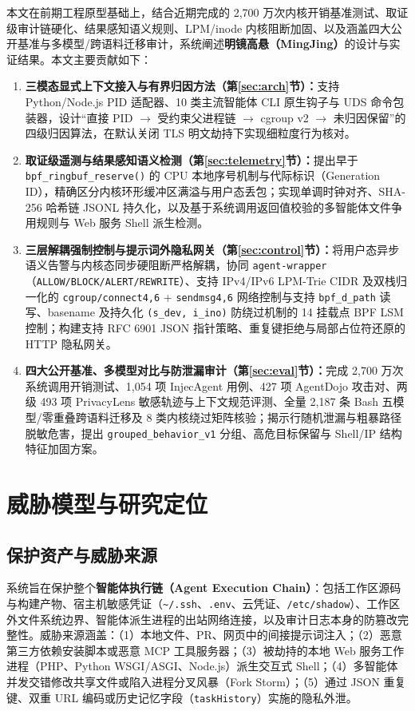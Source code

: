 \documentclass[UTF8,a4paper,zihao=-4,twocolumn]{ctexart}
\newcommand{\code}[1]{\texttt{\small #1}}
\begin{document}
本文在前期工程原型\cite{mingjingrepo}基础上，结合近期完成的 2,700 万次内核开销基准测试、取证级审计链硬化、结果感知语义规则、LPM/inode 内核阻断加固、以及涵盖四大公开基准与多模型/跨语料迁移审计，系统阐述\textbf{明镜高悬（MingJing）}的设计与实证结果。本文主要贡献如下：
\begin{enumerate}
  \item \textbf{三模态显式上下文接入与有界归因方法（第\ref{sec:arch}节）：}支持 Python/Node.js PID 适配器、10 类主流智能体 CLI 原生钩子与 UDS 命令包装器，设计“直接 PID $\to$ 受约束父进程链 $\to$ cgroup v2 $\to$ 未归因保留”的四级归因算法，在默认关闭 TLS 明文劫持下实现细粒度行为核对。
  \item \textbf{取证级遥测与结果感知语义检测（第\ref{sec:telemetry}节）：}提出早于 \code{bpf\_ringbuf\_reserve()} 的 CPU 本地序号机制与代际标识（Generation ID），精确区分内核环形缓冲区满溢与用户态丢包；实现单调时钟对齐、SHA-256 哈希链 JSONL 持久化，以及基于系统调用返回值校验的多智能体文件争用规则与 Web 服务 Shell 派生检测。
  \item \textbf{三层解耦强制控制与提示词外隐私网关（第\ref{sec:control}节）：}将用户态异步语义告警与内核态同步硬阻断严格解耦，协同 \code{agent-wrapper}（\code{ALLOW/BLOCK/ALERT/REWRITE}）、支持 IPv4/IPv6 LPM-Trie CIDR 及双栈归一化的 \code{cgroup/connect4,6} + \code{sendmsg4,6} 网络控制与支持 \code{bpf\_d\_path} 读写、basename 及持久化 \code{(s\_dev, i\_ino)} 防绕过机制的 14 挂载点 BPF LSM 控制；构建支持 RFC 6901 JSON 指针策略、重复键拒绝与局部占位符还原的 HTTP 隐私网关。
  \item \textbf{四大公开基准、多模型对比与防泄漏审计（第\ref{sec:eval}节）：}完成 2,700 万次系统调用开销测试、1,054 项 InjecAgent 用例、427 项 AgentDojo 攻击对、两级 493 项 PrivacyLens 敏感轨迹与上下文规范评测、全量 2,187 条 Bash 五模型/零重叠跨语料迁移及 8 类内核绕过矩阵核验；揭示行随机泄漏与粗暴路径脱敏危害，提出 \code{grouped\_behavior\_v1} 分组、高危目标保留与 Shell/IP 结构特征加固方案。
\end{enumerate}

\section{威胁模型与研究定位}
\label{sec:threat}

\subsection{保护资产与威胁来源}
系统旨在保护整个\textbf{智能体执行链（Agent Execution Chain）}：包括工作区源码与构建产物、宿主机敏感凭证（\code{\textasciitilde/.ssh}、\code{.env}、云凭证、\code{/etc/shadow}）、工作区外文件系统边界、智能体派生进程的出站网络连接，以及审计日志本身的防篡改完整性。威胁来源涵盖：（1）本地文件、PR、网页中的间接提示词注入；（2）恶意第三方依赖安装脚本或恶意 MCP 工具服务器；（3）被劫持的本地 Web 服务工作进程（PHP、Python WSGI/ASGI、Node.js）派生交互式 Shell；（4）多智能体并发交错修改共享文件或陷入进程分叉风暴（Fork Storm）；（5）通过 JSON 重复键、双重 URL 编码或历史记忆字段（\code{taskHistory}）实施的隐私外泄。
\end{document}
